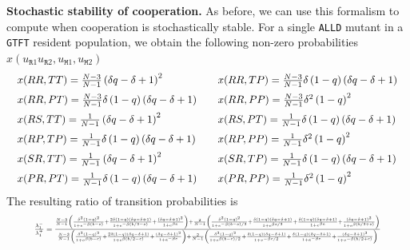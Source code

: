\documentclass[11pt]{article}
\def\alld{\texttt{ALLD}}
\def\gtft{\texttt{GTFT}}
\def\resident{\texttt{R}}
\def\mutant{\texttt{M}}
\theoremstyle{plainCl1}
\theoremstyle{plainCl2}
\begin{document}
\noindent
{\bf Stochastic stability of cooperation.}
As before, we can use this formalism to compute when cooperation is stochastically stable. For a single \alld{} mutant in a \gtft{} resident population, we obtain the following non-zero probabilities \(x(u_{\resident1} u_{\resident 2}, u_{\mutant 1},u_{\mutant 2})\)
\begin{equation*}
  \setlength{\arraycolsep}{10pt}
\begin{array}{ll}
  x(RR, TT) =  \frac{N - 3}{N - 1}\left(\delta q - \delta + 1\right)^{2} & 
  x(RR, TP) =  \frac{N - 3}{N - 1} \delta \left(1-q \right) \left(\delta q - \delta + 1\right)\\[0.2cm]
  x(RR, PT) =  \frac{N - 3}{N - 1} \delta \left(1-q\right) \left(\delta q - \delta + 1\right) &
  x(RR, PP) =  \frac{N - 3}{N - 1} \delta^{2}  \left(1 - q\right)^{2}\\[0.2cm]
  x(RS, TT) =  \frac{1}{N-1} \left(\delta q - \delta + 1\right)^{2} &
  x(RS, PT) =  \frac{1}{N-1} \delta \left(1-q\right) \left(\delta q - \delta + 1\right) \\[0.2cm]
  x(RP, TP) =  \frac{1}{N-1} \delta \left(1-q\right) \left(\delta q - \delta + 1\right) &
  x(RP, PP) =  \frac{1}{N-1} \delta^{2} \left(1 - q\right)^{2} \\[0.2cm]
  x(SR, TT) =  \frac{1}{N-1} \left(\delta q - \delta + 1\right)^{2} &
  x(SR, TP) =  \frac{1}{N-1} \delta \left(1-q\right) \left(\delta q - \delta + 1\right)\\[0.2cm]
  x(PR, PT) =  \frac{1}{N-1} \delta \left(1-q\right) \left(\delta q - \delta + 1\right) &
  x(PR, PP) =  \frac{1}{N-1} \delta^{2} \left(1-q\right)^{2}
  \end{array}
\end{equation*}
The resulting ratio of transition probabilities is
\begin{equation}
  \resizebox{.9\textwidth}{!}
  {%
$\frac{\lambda^{-}_1}{\lambda^{+}_1} =
\frac{\frac{N - 3}{N-1} \left(\frac{\delta^{2} \left(1-q\right)^{2}}{1 + e^{- \beta \left(b - c\right)}} + \frac{2 \delta \left(1 - q\right) \left(\delta q - \delta + 1\right)}{1 + e^{- \beta \left(b/2 - c\right)}} + \frac{\left(\delta q - \delta + 1\right)^{2}}{1+e^{\beta c}}\right) + \frac{2}{N-1} \left(\frac{\delta^{2} \left(1-q\right)^{2}}{1 + e^{- \beta \left(b - c\right)/2}} + \frac{\delta \left(1 - q\right) \left(\delta q - \delta + 1\right)}{1+e^{\beta c/2} } + \frac{\delta \left(1 - q\right) \left(\delta q - \delta + 1\right)}{1+e^{\beta c} } + \frac{\left(\delta q - \delta + 1\right)^{2}}{1 + e^{ \beta \left( b/2 + c\right)}}\right)}
{\frac{N - 3}{N-1} \left(\frac{\delta^{2} \left(1 - q\right)^{2}}{1 + e^{\beta \left( b - c\right)}} + \frac{2 \delta \left(1 - q\right) \left(\delta q - \delta + 1\right)}{1 + e^{ \beta \left(b/2 - c\right)}} + \frac{\left(\delta q - \delta + 1\right)^{2}}{1 + e^{- \beta c}}\right) 
+ \frac{2}{N-1} \left(\frac{\delta^{2} \left(1 - q\right)^{2}}{1 + e^{ \beta \left(b-c\right)/2}} + \frac{\delta \left(1 - q\right) \left(\delta q - \delta + 1\right)}{1 + e^{- \beta c/2}} + \frac{\delta \left(1 - q\right) \left(\delta q - \delta + 1\right)}{1 + e^{- \beta c}} + \frac{\left(\delta q - \delta + 1\right)^{2}}{1 + e^{- \beta \left(b/2 + c\right)}}\right)}
$}
\end{equation}
\end{document}
